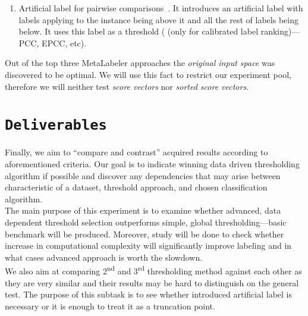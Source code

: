 \documentclass[12pt,a4paper,twocolumn]{article}
\newcommand{\ts}{\textsuperscript}
\begin{document}
\begin{enumerate}
\item Artificial label for pairwise comparisons~\cite{conf/icml/DembczynskiCH10}. It introduces an artificial label with labels applying to the instance being above it and all the rest of labels being below. It uses this label as a threshold ( (only for calibrated label ranking)---PCC, EPCC, etc).

\end{enumerate}

Out of the top three MetaLabeler approaches the \emph{original input space} was discovered to be optimal. We will use this fact to restrict our experiment pool, therefore we will neither test \emph{score vectors} nor \emph{sorted score vectors}.\\



\section*{\texttt{Deliverables}}
Finally, we aim to ``compare and contrast'' acquired results according to aforementioned criteria. Our goal is to indicate winning data driven thresholding algorithm if possible and discover any dependencies that may arise between characteristic of a dataset, threshold approach, and chosen classification algorithm.\\

The main purpose of this experiment is to examine whether advanced, data dependent threshold selection outperforms simple, global thresholding---basic benchmark will be produced. Moreover, study will be done to check whether increase in computational complexity will significantly improve labeling and in what cases advanced approach is worth the slowdown.\\

We also aim at comparing 2\ts{nd} and 3\ts{rd} thresholding method against each other as they are very similar and their results may be hard to distinguish on the general test. The purpose of this subtask is to see whether introduced artificial label is necessary or it is enough to treat it as a truncation point.\\


{}


\end{document}
